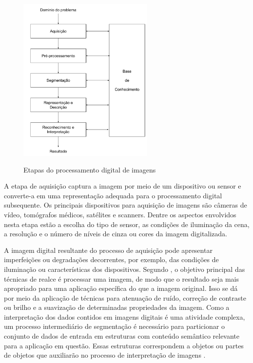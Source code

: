 \documentclass[12pt,oneside,a4paper,english,french,spanish,brazil,]{abntex2}
\begin{document}
\begin{figure}[ht]
\centering
\caption{Etapas do processamento digital de imagens}
\includegraphics[width=0.6\textwidth]{imagens/PDI_Etapas_PDI.pdf}
\label{fig:PDI_Etapas_PDI}
\end{figure}

A etapa de aquisição captura a imagem por meio de um dispositivo ou sensor e converte-a em uma representação adequada para o processamento digital subsequente. Os principais dispositivos para aquisição de imagens são câmeras de vídeo, tomógrafos médicos, satélites e scanners. Dentre os aspectos envolvidos nesta etapa estão a escolha do tipo de sensor, as condições de iluminação da cena, a resolução e o número de níveis de cinza ou cores da imagem digitalizada.

A imagem digital resultante do processo de aquisição pode apresentar imperfeições ou degradações decorrentes, por exemplo, das condições de iluminação ou características dos dispositivos. Segundo \citet{gonzalez:2012}, o objetivo principal das técnicas de realce é processar uma imagem, de modo que o resultado seja mais apropriado para uma aplicação específica do que a imagem original. Isso se dá por meio da aplicação de técnicas para atenuação de ruído, correção de contraste ou brilho e a suavização de determinadas propriedades da imagem.
Como a interpretação dos dados contidos em imagens digitais é uma atividade complexa, um processo intermediário de segmentação é necessário para particionar o conjunto de dados de entrada em estruturas com conteúdo semântico relevante para a aplicação em questão. Essas estruturas correspondem a objetos ou partes de objetos que auxiliarão no processo de interpretação de imagens \cite{pedrini:2008}.
\end{document}
